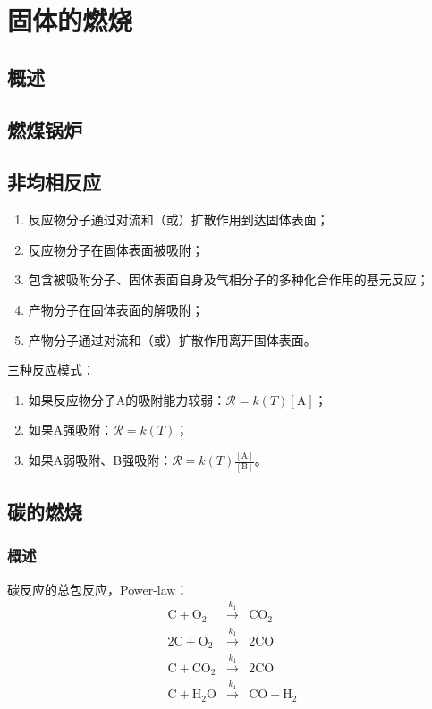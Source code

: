 \section{固体的燃烧}
\subsection{概述}
\subsection{燃煤锅炉}
\subsection{非均相反应}
\begin{enumerate}
    \item 反应物分子通过对流和（或）扩散作用到达固体表面；
    \item 反应物分子在固体表面被吸附；
    \item 包含被吸附分子、固体表面自身及气相分子的多种化合作用的基元反应；
    \item 产物分子在固体表面的解吸附；
    \item 产物分子通过对流和（或）扩散作用离开固体表面。
\end{enumerate}
三种反应模式：
\begin{enumerate}
    \item 如果反应物分子A的吸附能力较弱：\(\mathcal{R}=k(T)[\mathrm{A}]\)；
    \item 如果A强吸附：\(\mathcal{R}=k(T)\)；
    \item 如果A弱吸附、B强吸附：\(\mathcal{R}=k(T)\frac{[\mathrm{A}]}{[\mathrm{B}]}\)。
\end{enumerate}

\subsection{碳的燃烧}
\subsubsection{概述}
碳反应的总包反应，Power-law：
\begin{eqnarray}
    \mathrm{C + O_2} &\overset{k_1}{\rightarrow}& \mathrm{CO_2}\\
    \mathrm{2C + O_2} &\overset{k_1}{\rightarrow}& \mathrm{2CO}\\
    \mathrm{C+CO_2} &\overset{k_1}{\rightarrow}& \mathrm{2CO}\\
    \mathrm{C+H_2O} &\overset{k_1}{\rightarrow}& \mathrm{CO+H_2}
\end{eqnarray}

